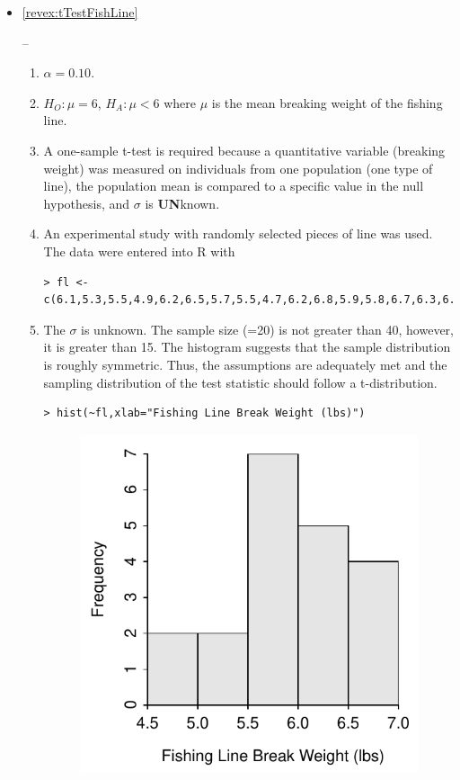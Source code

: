 \documentclass[10pt,openany]{book}\usepackage[]{graphicx}\usepackage[]{color}
\makeatletter
\newenvironment{kframe}{%
 \def\at@end@of@kframe{}%
 \ifinner\ifhmode%
  \def\at@end@of@kframe{\end{minipage}}%
  \begin{minipage}{\columnwidth}%
 \fi\fi%
 \def\FrameCommand##1{\hskip\@totalleftmargin \hskip-\fboxsep
 \colorbox{shadecolor}{##1}\hskip-\fboxsep
     \hskip-\linewidth \hskip-\@totalleftmargin \hskip\columnwidth}%
 \MakeFramed {\advance\hsize-\width
   \@totalleftmargin\z@ \linewidth\hsize
   \@setminipage}}%
 {\par\unskip\endMakeFramed%
 \at@end@of@kframe}
\newenvironment{knitrout}{}{} %
\makeatother
\begin{document}
\begin{itemize}
  \item \hypertarget{ans:tTestFishLine}{\ref{revex:tTestFishLine}} --
    \begin{enumerate}
      \item $\alpha=0.10$.
      \item $H_{O}:\mu=6$, $H_{A}:\mu<6$ where $\mu$ is the mean breaking weight of the fishing line.
      \item A one-sample t-test is required because a quantitative variable (breaking weight) was measured on individuals from one population (one type of line), the population mean is compared to a specific value in the null hypothesis, and $\sigma$ is \textbf{UN}known.
      \item An experimental study with randomly selected pieces of line was used.  The data were entered into R with
\begin{knitrout}
\color{fgcolor}\begin{kframe}
\begin{verbatim}
> fl <- c(6.1,5.3,5.5,4.9,6.2,6.5,5.7,5.5,4.7,6.2,6.8,5.9,5.8,6.7,6.3,6.2,5.4,5.5,6.7,5.9)
\end{verbatim}
\end{kframe}
\end{knitrout}
      \item The $\sigma$ is unknown.  The sample size (=20) is not greater than 40, however, it is greater than 15.  The histogram  suggests that the sample distribution is roughly symmetric.  Thus, the assumptions are adequately met and the sampling distribution of the test statistic should follow a t-distribution.
\begin{knitrout}
\color{fgcolor}\begin{kframe}
\begin{verbatim}
> hist(~fl,xlab="Fishing Line Break Weight (lbs)")
\end{verbatim}
\end{kframe}\begin{figure}[hbtp]

{\centering \includegraphics[width=.4\linewidth]{Figs/FishingLineHist-1} 

}
\end{figure}
\end{knitrout}
\end{enumerate}
\end{itemize}
\end{document}
